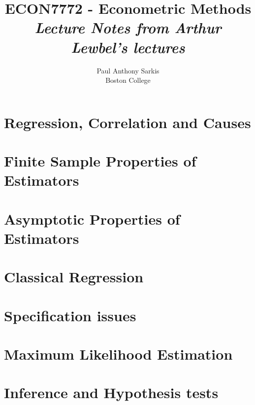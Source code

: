 \documentclass[12pt]{report} %
\begin{document}
\date{}
\title{\textbf{\huge{ECON7772 - Econometric Methods}}\\ \textit{Lecture Notes from Arthur Lewbel's lectures}}
\author{Paul Anthony Sarkis\\ Boston College} 
 
\maketitle

\tableofcontents

\chapter*{Regression, Correlation and Causes}

\chapter{Finite Sample Properties of Estimators}



\chapter{Asymptotic Properties of Estimators} 



\chapter{Classical Regression}



\chapter{Specification issues}



\chapter{Maximum Likelihood Estimation}



\chapter{Inference and Hypothesis tests}
\end{document}
